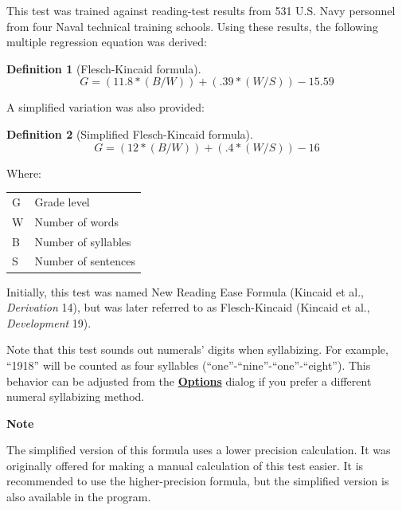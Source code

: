 \documentclass[
]{book}
\newenvironment{notesection}
    {
    \begin{tcolorbox}[colframe=mediumblue,colback=lightblue,coltext=mediumblue,arc=3mm]
    \faLightbulb[regular] \textbf{Note} \newline
    }
    {
    \end{tcolorbox}
    }
\theoremstyle{definition}
\newtheorem{definition}{Definition}[chapter]
\theoremstyle{definition}
\theoremstyle{definition}
\theoremstyle{definition}
\theoremstyle{remark}
\begin{document}
This test was trained against reading-test results from 531 U.S. Navy personnel from four Naval technical training schools. Using these results, the following multiple regression equation was derived:

\begin{definition}[Flesch-Kincaid formula]
\protect\hypertarget{def:fleschkincaid}{}{\label{def:fleschkincaid} {} }\[
G = (11.8*(B/W)) + (.39*(W/S)) - 15.59
\]
\end{definition}

A simplified variation was also provided:

\begin{definition}[Simplified Flesch-Kincaid formula]
\protect\hypertarget{def:fleschkincaidsimplified}{}{\label{def:fleschkincaidsimplified} {} }\[
G = (12*(B/W)) + (.4*(W/S)) - 16
\]
\end{definition}

Where:

\begin{longtable}[]{@{}
  >{\raggedright\arraybackslash}p{}
  >{\raggedright\arraybackslash}p{}@{}}
\toprule
\endhead
G & Grade level \\
W & Number of words \\
B & Number of syllables \\
S & Number of sentences \\
\bottomrule
\end{longtable}

Initially, this test was named New Reading Ease Formula (Kincaid et al., \emph{Derivation} 14), but was later referred to as Flesch-Kincaid (Kincaid et al., \emph{Development} 19).

Note that this test sounds out numerals' digits when syllabizing. For example, ``1918'' will be counted as four syllables (``one''-``nine''-``one''-``eight''). This behavior can be adjusted from the \protect\hyperlink{readability-test-options}{\textbf{Options}} dialog if you prefer a different numeral syllabizing method.

\begin{notesection}
The simplified version of this formula uses a lower precision calculation. It was originally offered for making a manual calculation of this test easier. It is recommended to use the higher-precision formula, but the simplified version is also available in the program.

\end{notesection}
\end{document}
